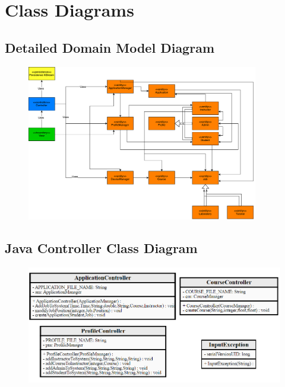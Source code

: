 \documentclass[12pt]{article}
\begin{document}
\section{Class Diagrams}
\subsection{Detailed Domain Model Diagram}
\begin{figure}[H]
	\centering
	\includegraphics[width =0.9\textwidth]{DetailedDomainModelDiagram.pdf}
\end{figure}
\subsection{Java Controller Class Diagram}
\begin{figure}[H]
	\centering
	\includegraphics[]{ControllerPackageClassDiagramJava.png}
\end{figure}
\end{document}
